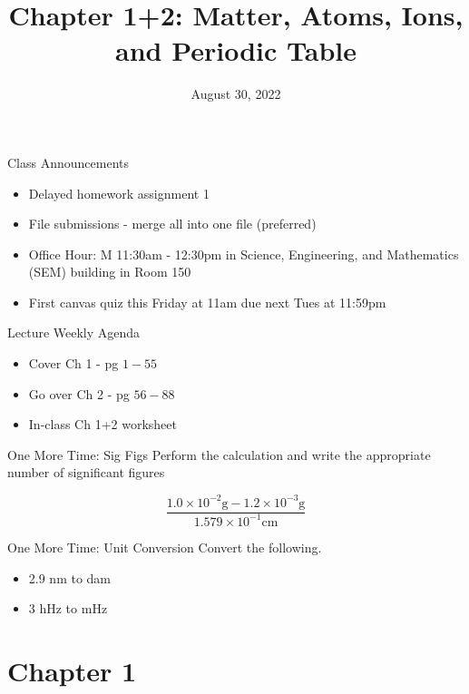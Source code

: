 \documentclass[11pt]{beamer}
\title{Chapter 1+2: Matter, Atoms, Ions, and Periodic Table}
\institute{Chemistry Department, Cypress College}
\date{August 30, 2022}
\begin{document}
\begin{frame}
  \titlepage
\end{frame}

\begin{frame}{Class Announcements}
  \begin{itemize}
  \item Delayed homework assignment 1
  \item File submissions - merge all into one file (preferred)
  \item Office Hour: M 11:30am - 12:30pm in Science, Engineering,
    and Mathematics (SEM) building in Room 150
  \item First canvas quiz this Friday at 11am due next Tues
    at 11:59pm
  \end{itemize}
\end{frame}

\begin{frame}{Lecture Weekly Agenda}
  \begin{itemize}
  \item Cover Ch 1 - pg $1 - 55$
  \item Go over Ch 2 - pg $56 - 88$
  \item In-class Ch 1+2 worksheet
  \end{itemize}
\end{frame}

\begin{frame}{One More Time: Sig Figs}
  Perform the calculation and write the appropriate number
  of significant figures
  
  \begin{equation*}
    \frac{1.0\times 10^{-2}\text{g} - 1.2\times 10^{-3}\text{g}}
    {1.579\times 10^{-1}\text{cm}}
  \end{equation*}
\end{frame}

\begin{frame}{One More Time: Unit Conversion}
  Convert the following.

  \begin{itemize}
  \item 2.9 nm to dam
  \item 3 hHz to mHz
  \end{itemize}
\end{frame}

\section{Chapter 1}
\end{document}
